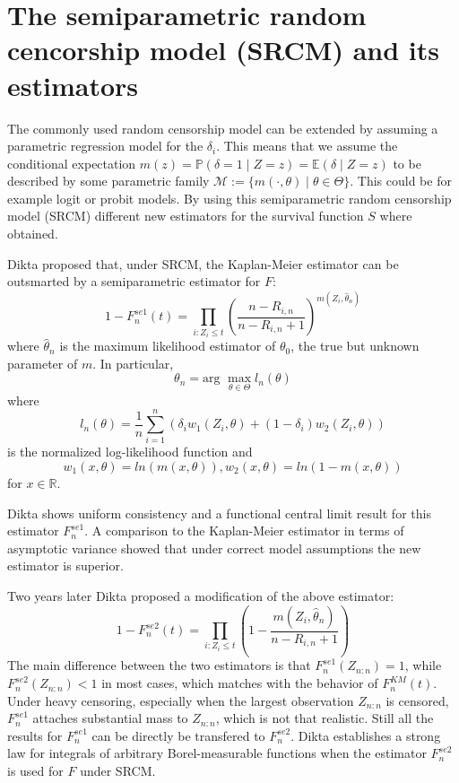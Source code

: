 \section{The semiparametric random cencorship model (SRCM) and its estimators}

The commonly used random censorship model can be extended by assuming a parametric regression model for the $\delta_i$. This means that we assume the conditional expectation $m(z) = \mathbb{P}(\delta = 1\mid Z=z) = \mathbb{E}(\delta \mid Z=z)$ to be described by some parametric family $\mathcal{M}:= \{m(\cdotp,\theta) \mid \theta \in \Theta\}$. This could be for example logit or probit models. 
By using this semiparametric random censorship model (SRCM) different new estimators for the survival function $S$ where obtained.

Dikta proposed that, under SRCM, the Kaplan-Meier estimator can be outsmarted by a semiparametric estimator for $F$:
\begin{equation}\label{fnse1}
1-F_n^{se1}(t) = \prod_{i:Z_i \leq t} \left( \frac{n-R_{i,n}}{n-R_{i,n} + 1} \right)^{m(Z_i,\hat{\theta}_n)}
\end{equation}
where $\hat{\theta}_n$ is the maximum likelihood estimator of $\theta_0$, the true but unknown parameter of $m$.
In particular,
\[
\theta_n = \text{arg }\max_{\theta \in \Theta} l_n(\theta)
\]
where 
\[
l_n(\theta) = \frac{1}{n} \sum_{i=1}^{n} \left( \delta_i w_1(Z_i,\theta) + (1-\delta_i) w_2(Z_i,\theta) \right)
\]
is the normalized log-likelihood function and
\[
w_1(x,\theta) = ln(m(x,\theta)),
w_2(x,\theta) = ln(1-m(x,\theta)) 
\]
for $x \in \mathbb{R}$.

Dikta shows uniform consistency and a functional central limit result for this estimator $F_n^{se1}$. A comparison to the Kaplan-Meier estimator in terms of asymptotic variance showed that under correct model assumptions the new estimator is superior\cite{PAPER2}.

Two years later Dikta proposed a modification of the above estimator:
\begin{equation}\label{fnse2}
1-F_n^{se2}(t) = \prod_{i:Z_i \leq t} \left( 1 - \frac{m(Z_i,\hat{\theta}_n)}{n-R_{i,n} + 1} \right)
\end{equation}
The main difference between the two estimators is that $F_n^{se1}(Z_{n:n}) = 1$, while $F_n^{se2}(Z_{n:n}) < 1$ in most cases, which matches with the behavior of $F_n^{KM}(t)$. Under heavy censoring, especially when the largest observation $Z_{n:n}$ is censored, $F_n^{se1}$ attaches substantial mass to $Z_{n:n}$, which is not that realistic. Still all the results for $F_n^{se1}$ can be directly be transfered to $F_n^{se2}$. 
Dikta establishes a strong law for integrals of arbitrary Borel-measurable functions when the estimator $F_n^{se2}$ is used for $F$ under SRCM\cite{PAPER3}.

